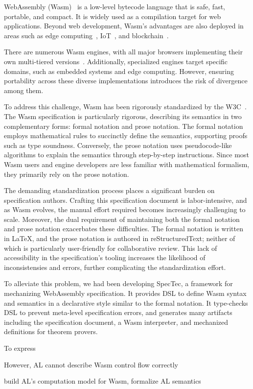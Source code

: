 WebAssembly (Wasm)~\cite{wasm} is a low-level bytecode language that is safe, fast,
portable, and compact.
It is widely used as a compilation target for web applications.
Beyond web development, Wasm's advantages are also deployed in areas such as
edge computing~\cite{wasm-edge}, IoT~\cite{wasm-iot}, and
blockchain~\cite{wasm-block}.


There are numerous Wasm engines, with all major browsers implementing their own
multi-tiered versions~\cite{v8, spidermonkey, webkit}.
Additionally, specialized engines target specific domains, such as embedded
systems and edge computing.
However, ensuring portability across these diverse implementations introduces
the risk of divergence among them.


To address this challenge, Wasm has been rigorously standardized by the
W3C~\cite{wasm-w3c}.
The Wasm specification is particularly rigorous, describing its semantics in
two complementary forms: formal notation and prose notation.
The formal notation employs mathematical rules to succinctly define the
semantics, supporting proofs such as type soundness.
Conversely, the prose notation uses pseudocode-like algorithms to explain the
semantics through step-by-step instructions.
Since most Wasm users and engine developers are less familiar with mathematical
formalism, they primarily rely on the prose notation.


The demanding standardization process places a significant burden on
specification authors.
Crafting this specification document is labor-intensive, and as Wasm evolves,
the manual effort required becomes increasingly challenging to scale.
Moreover, the dual requirement of maintaining both the formal notation and
prose notation exacerbates these difficulties.
The formal notation is written in LaTeX, and the prose notation is authored
in reStructuredText; neither of which is particularly user-friendly for
collaborative review.
This lack of accessibility in the specification's tooling increases the
likelihood of inconsistensies and errors, further complicating the
standardization effort.


To alleviate this problem, we had been developing SpecTec, a framework for
mechanizing WebAssembly specification.
It provides DSL to define Wasm syntax and semantics in a declarative style
similar to the formal notation.
It type-checks DSL to prevent meta-level specification errors, and generates
many artifacts including the specification document, a Wasm interpreter, and
mechanized definitions for theorem provers.


To express 


However, AL cannot describe Wasm control flow correctly


build AL's computation model for Wasm, formalize AL semantics
